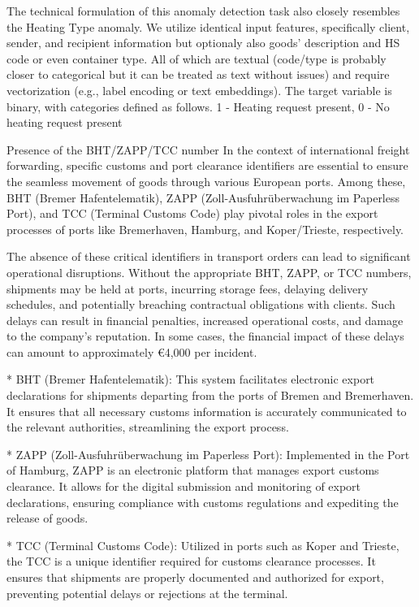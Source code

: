 The technical formulation of this anomaly detection task also closely resembles the Heating Type anomaly. We utilize identical input features, specifically client, sender, and recipient information but optionaly also goods' description and HS code or even container type. All of which are textual (code/type is probably closer to categorical but it can be treated as text without issues) and require vectorization (e.g., label encoding or text embeddings). The target variable is binary, with categories defined as follows. 1 - Heating request present, 0 - No heating request present

\secc Presence of the BHT/ZAPP/TCC number
In the context of international freight forwarding, specific customs and port clearance identifiers are essential to ensure the seamless movement of goods through various European ports. Among these, BHT (Bremer Hafentelematik), ZAPP (Zoll-Ausfuhrüberwachung im Paperless Port), and TCC (Terminal Customs Code) play pivotal roles in the export processes of ports like Bremerhaven, Hamburg, and Koper/Trieste, respectively.

The absence of these critical identifiers in transport orders can lead to significant operational disruptions. Without the appropriate BHT, ZAPP, or TCC numbers, shipments may be held at ports, incurring storage fees, delaying delivery schedules, and potentially breaching contractual obligations with clients. Such delays can result in financial penalties, increased operational costs, and damage to the company's reputation. In some cases, the financial impact of these delays can amount to approximately €4,000 per incident.

\begitems
* BHT (Bremer Hafentelematik): This system facilitates electronic export declarations for shipments departing from the ports of Bremen and Bremerhaven. It ensures that all necessary customs information is accurately communicated to the relevant authorities, streamlining the export process. 

* ZAPP (Zoll-Ausfuhrüberwachung im Paperless Port): Implemented in the Port of Hamburg, ZAPP is an electronic platform that manages export customs clearance. It allows for the digital submission and monitoring of export declarations, ensuring compliance with customs regulations and expediting the release of goods. 

* TCC (Terminal Customs Code): Utilized in ports such as Koper and Trieste, the TCC is a unique identifier required for customs clearance processes. It ensures that shipments are properly documented and authorized for export, preventing potential delays or rejections at the terminal. 
\enditems

